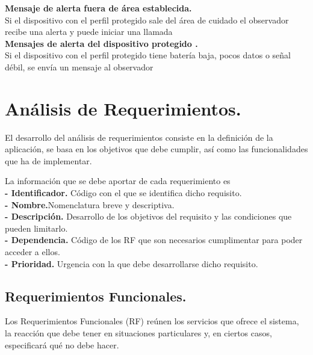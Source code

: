 \textbf{ Mensaje de alerta fuera de área establecida.}  \\

Si el dispositivo con el perfil protegido sale del área de cuidado el observador recibe una alerta y puede iniciar una llamada \\

\textbf{ Mensajes de alerta del dispositivo protegido .}  \\

Si el dispositivo con el perfil protegido tiene batería baja, pocos datos o señal débil, se envía un mensaje al observador
\newpage 
\section{Análisis de Requerimientos.}
El desarrollo del análisis de requerimientos consiste en la definición de la aplicación, se basa en los objetivos que debe cumplir, así como las funcionalidades que ha de implementar.

La información que se debe aportar de cada requerimiento es\\
\textbf{- Identificador.} Código con el que se identifica dicho requisito.\\
\textbf{- Nombre.}Nomenclatura breve y descriptiva.\\
\textbf{- Descripción.} Desarrollo de los objetivos del requisito y las condiciones que pueden limitarlo.\\
\textbf{- Dependencia.} Código de los RF que son necesarios cumplimentar para poder 
acceder a ellos.\\
\textbf{- Prioridad.} Urgencia con la que debe desarrollarse dicho requisito.\\

\subsection{Requerimientos Funcionales.}
Los Requerimientos Funcionales (RF) reúnen los servicios que ofrece el sistema, la reacción que debe tener en situaciones particulares y, en ciertos casos, especificará qué no debe hacer.\\

